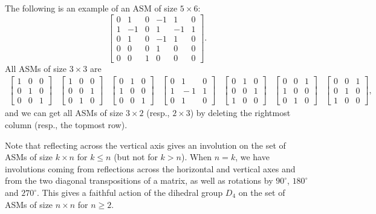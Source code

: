 \documentclass[12pt]{amsart}
\numberwithin{equation}{section}
\theoremstyle{definition}
\begin{document}
The following is an example of an ASM of size $5 \times 6$:
\begin{equation}\label{eq:anotherASM}
\begin{bmatrix}
0 & 1 & 0 & -1 & 1 & 0 \\
1 & -1 & 0 & 1 & -1 & 1 \\
0 & 1  & 0 & -1 & 1 & 0 \\
0 & 0 & 0 & 1 & 0 & 0 \\
0 & 0 & 1 & 0 & 0 & 0
\end{bmatrix}.
\end{equation}
All ASMs of size $3 \times 3$ are
$$\begin{array}{ccccccc}
\begin{bmatrix} 1 & 0 & 0 \\ 0 & 1 & 0 \\ 0 & 0 & 1 \end{bmatrix} & \begin{bmatrix} 1 & 0 & 0 \\ 0 & 0 & 1 \\ 0 & 1 & 0 \end{bmatrix} & \begin{bmatrix} 0 & 1 & 0 \\ 1 & 0 & 0 \\ 0 & 0 & 1 \end{bmatrix} & \begin{bmatrix} 0 & 1 & 0 \\ 1 & \!-1\! & 1 \\ 0 & 1 & 0 \end{bmatrix} & \begin{bmatrix} 0 & 1 & 0 \\ 0 & 0 & 1 \\ 1 & 0 & 0 \end{bmatrix} & \begin{bmatrix} 0 & 0 & 1 \\ 1 & 0 & 0 \\ 0 & 1 & 0 \end{bmatrix} & \begin{bmatrix} 0 & 0 & 1 \\ 0 & 1 & 0 \\ 1 & 0 & 0 \end{bmatrix},
\end{array}$$
and we can get all ASMs of size $3 \times 2$ (resp., $2 \times 3$) by deleting the rightmost column (resp., the topmost row).

Note that reflecting across the vertical axis gives an involution on the set of ASMs of size $k \times n$ for $k \leq n$ (but not for $k > n$). When $n = k$, we have involutions coming from reflections across the horizontal and vertical axes and from the two diagonal transpositions of a matrix, as well as rotations by $90^\circ$, $180^\circ$ and $270^\circ$. This gives a faithful action of the dihedral group $D_4$ on the set of ASMs of size $n \times n$ for $n \geq 2$.
\end{document}
